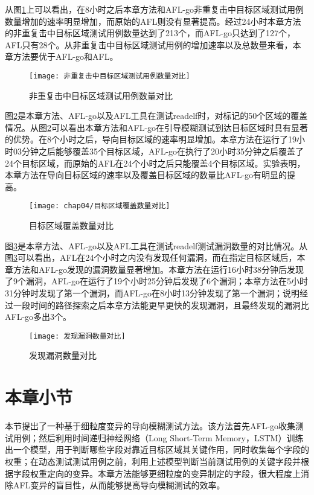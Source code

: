 从图\ref{非重复击中目标区域测试用例数量对比}上可以看出，在8小时之后本章方法和AFL-go非重复击中目标区域测试用例数量增加的速率明显增加，而原始的AFL则没有显著提高。经过24小时本章方法的非重复击中目标区域测试用例数量达到了213个，而AFL-go只达到了127个，AFL只有28个。从非重复击中目标区域测试用例的增加速率以及总数量来看，本章方法要优于AFL-go和AFL。

\begin{figure}[htb]
\begin{center}
\texttt{[image: 非重复击中目标区域测试用例数量对比]}
\end{center}
\caption{非重复击中目标区域测试用例数量对比}
\label{非重复击中目标区域测试用例数量对比}
\end{figure}

图\ref{目标区域覆盖数量对比}是本章方法、AFL-go以及AFL工具在测试readelf时，对标记的50个区域的覆盖情况。从图\ref{目标区域覆盖数量对比}可以看出本章方法和AFL-go在引导模糊测试到达目标区域时具有显著的优势。在8个小时之后，导向目标区域的速率明显增加。本章方法在运行了19小时03分钟之后能够覆盖35个目标区域，AFL-go在执行了20小时35分钟之后覆盖了24个目标区域，而原始的AFL在24个小时之后只能覆盖4个目标区域。实验表明，本章方法在导向目标区域的速率以及覆盖目标区域的数量比AFL-go有明显的提高。

\begin{figure}[htb]
\begin{center}
\texttt{[image: chap04/目标区域覆盖数量对比]}
\end{center}
\caption{目标区域覆盖数量对比}
\label{目标区域覆盖数量对比}
\end{figure}

图\ref{发现漏洞数量对比}是本章方法、AFL-go以及AFL工具在测试readelf测试漏洞数量的对比情况。从图\ref{发现漏洞数量对比}可以看出，AFL在24个小时之内没有发现任何漏洞，而在指定目标区域后，本章方法和AFL-go发现的漏洞数量显著增加。本章方法在运行16小时38分钟后发现了9个漏洞，AFL-go在运行了19个小时25分钟后发现了6个漏洞；本章方法在5小时31分钟时发现了第一个漏洞，而AFL-go在8小时13分钟发现了第一个漏洞；说明经过一段时间的路径探索之后本章方法能更早更快的发现漏洞，且最终发现的漏洞比AFL-go多出3个。
\begin{figure}[htb]
\begin{center}
\texttt{[image: 发现漏洞数量对比]}
\end{center}
\caption{发现漏洞数量对比}
\label{发现漏洞数量对比}
\end{figure}

\section{本章小节}

本节提出了一种基于细粒度变异的导向模糊测试方法。该方法首先AFL-go收集测试用例；然后利用时间递归神经网络（Long Short-Term Memory，LSTM）训练出一个模型，用于判断哪些字段对靠近目标区域其关键作用，同时收集每个字段的权重；在动态测试测试用例之前，利用上述模型判断当前测试用例的关键字段并根据字段权重定向的变异。本章方法能够更细粒度的变异制定的字段，很大程度上消除AFL变异的盲目性，从而能够提高导向模糊测试的效率。

\afterpage{\blankpage}